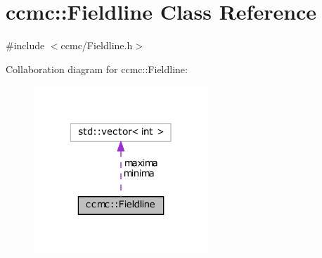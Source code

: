 \hypertarget{classccmc_1_1_fieldline}{\section{ccmc\-:\-:Fieldline Class Reference}
\label{classccmc_1_1_fieldline}
}


{\ttfamily \#include $<$ccmc/\-Fieldline.\-h$>$}



Collaboration diagram for ccmc\-:\-:Fieldline\-:
\nopagebreak
\begin{figure}[H]
\begin{center}
\leavevmode
\includegraphics[width=186pt]{classccmc_1_1_fieldline__coll__graph}
\end{center}
\end{figure}
